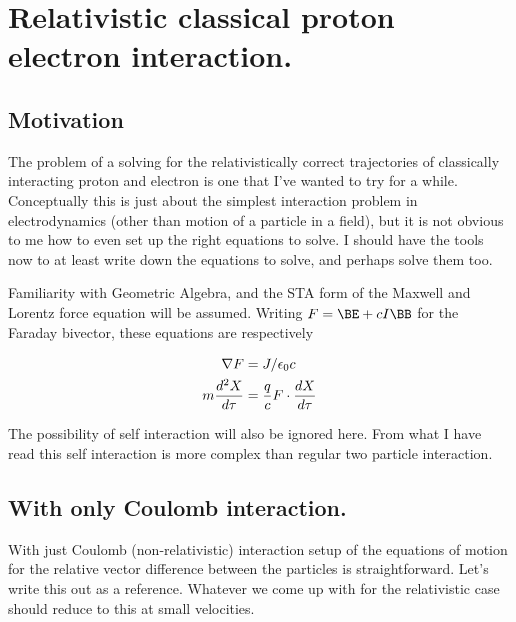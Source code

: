 

\chapter{Relativistic classical proton electron interaction.}
\label{chap:nuclearInteraction}
{}
\date{Sept 13, 2009}

\beginArtWithToc

\section{Motivation}

The problem of a solving for the relativistically correct trajectories of classically interacting proton and electron is one that I've wanted to try for a while.  Conceptually this is just about the simplest interaction problem in electrodynamics (other than motion of a particle in a field), but it is not obvious to me how to even set up the right equations to solve.  I should have the tools now to at least write down the equations to solve, and perhaps solve them too.

Familiarity with Geometric Algebra, and the STA form of the Maxwell and Lorentz force equation will be assumed.  Writing $F = \BE + c I \BB$ for the Faraday bivector, these equations are respectively

\begin{align}\label{eqn:nuclearInteraction:boo1}
\nabla F &= J/\epsilon_0 c \\
m\frac{d^2 X}{d\tau} &= \frac{q}{c} F \cdot \frac{dX}{d\tau}
\end{align}

The possibility of self interaction will also be ignored here.  From what I have read this self interaction is more complex than regular two particle interaction.

\section{With only Coulomb interaction.}

With just Coulomb (non-relativistic) interaction setup of the equations of motion for the relative vector difference between the particles is straightforward.  Let's write this out as a reference.  Whatever we come up with for the relativistic case should reduce to this at small velocities.

